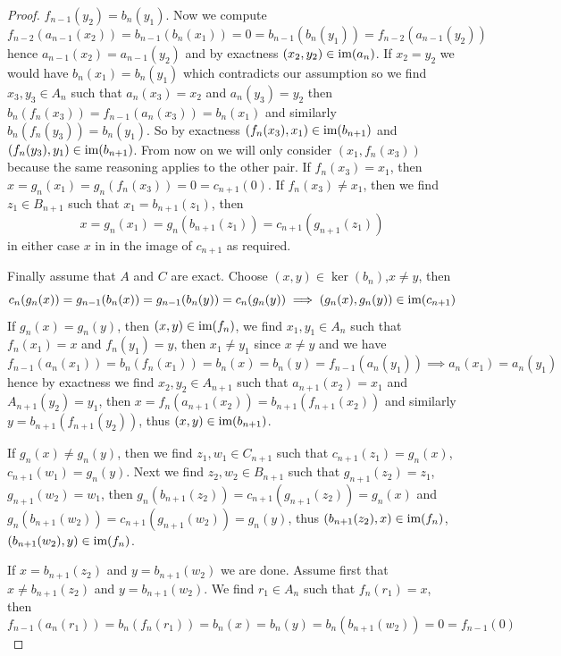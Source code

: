 \begin{proof}[Proof]
    $f_{n-1}(y_2) = b_n(y_1)$. Now we compute
    \[
    f_{n-2}(a_{n-1}(x_2)) = b_{n-1}(b_n(x_1)) = 0 = b_{n-1}(b_n(y_1)) =
    f_{n-2}(a_{n-1}(y_2))
    \]
    hence $a_{n-1}(x_2)=a_{n-1}(y_2)$ and by exactness $(x_2,y_2)\in\text{im}(a_n)$. 
    If $x_2=y_2$ we would have $b_n(x_1)=b_n(y_1)$ which contradicts our assumption 
    so we find $x_3,y_3\in A_n$ such that $a_n(x_3)=x_2$ and $a_n(y_3)=y_2$
    then $b_n(f_n(x_3)) = f_{n-1}(a_n(x_3)) = b_n(x_1)$ and similarly 
    $b_n(f_n(y_3)) = b_n(y_1)$. So by exactness $(f_n(x_3),x_1)\in\text{im}(b_{n+1})$
    and $(f_n(y_3),y_1)\in\text{im}(b_{n+1})$. From now on we will only consider $(x_1,f_n(x_3))$
    because the same reasoning applies to the other pair. If $f_n(x_3)=x_1$, then 
    $x=g_n(x_1) = g_n(f_n(x_3)) = 0 = c_{n+1}(0)$. If $f_n(x_3)\neq x_1$, then we find 
    $z_1\in B_{n+1}$ such that $x_1=b_{n+1}(z_1)$, then 
    \[
        x = g_n(x_1) = g_n(b_{n+1}(z_1)) = c_{n+1}(g_{n+1}(z_1))
    \]
    in either case $x$ in in the image of $c_{n+1}$ as required.\par 
    Finally assume that $A$ and $C$ are exact. Choose $(x,y)\in\ker(b_n)$,$x\neq y$, then 
    \[
    c_n(g_n(x)) = g_{n-1}(b_n(x)) = g_{n-1}(b_n(y)) = c_n(g_n(y)) \implies (g_n(x),g_n(y))\in\text{im}(c_{n+1})
    \]
    If $g_n(x)=g_n(y)$, then $(x,y)\in\text{im}(f_n)$, we find $x_1,y_1\in A_n$
    such that $f_n(x_1)=x$ and $f_n(y_1)=y$, then $x_1\neq y_1$ since $x\neq y$ and we have 
    \[
        f_{n-1}(a_n(x_1)) = b_n(f_n(x_1)) = b_n(x) = b_n(y) = f_{n-1}(a_n(y_1)) \implies a_n(x_1)=a_n(y_1)
    \]
    hence by exactness we find $x_2, y_2\in A_{n+1}$ such that 
    $a_{n+1}(x_2) = x_1$ and $A_{n+1}(y_2)=y_1$, then 
    $x=f_{n}(a_{n+1}(x_2)) = b_{n+1}(f_{n+1}(x_2))$ and similarly 
    $y = b_{n+1}(f_{n+1}(y_2))$, thus $(x,y)\in\text{im}(b_{n+1})$. \par 
    If $g_{n}(x)\neq g_n(y)$, then we find $z_1,w_1\in C_{n+1}$ such that 
    $c_{n+1}(z_1)=g_n(x)$, $c_{n+1}(w_1)=g_n(y)$. Next we find $z_2,w_2\in B_{n+1}$
    such that $g_{n+1}(z_2) = z_1$, $g_{n+1}(w_2) = w_1$, then 
    $g_n(b_{n+1}(z_2)) = c_{n+1}(g_{n+1}(z_2)) = g_n(x)$ and 
    $g_n(b_{n+1}(w_2)) = c_{n+1}(g_{n+1}(w_2)) = g_n(y)$, thus 
    $(b_{n+1}(z_2),x)\in\text{im}(f_n)$,$(b_{n+1}(w_2),y)\in\text{im}(f_n)$.\par 
    If $x=b_{n+1}(z_2)$ and $y=b_{n+1}(w_2)$ we are done. Assume first that 
    $x\neq b_{n+1}(z_2)$ and $y=b_{n+1}(w_2)$. We find $r_1\in A_n$ such that 
    $f_n(r_1)=x$, then 
    \[
        f_{n-1}(a_n(r_1)) = b_n(f_{n}(r_1)) = b_n(x) = b_n(y) = b_n(b_{n+1}(w_2)) = 0 = f_{n-1}(0)
    \]

\end{proof}
